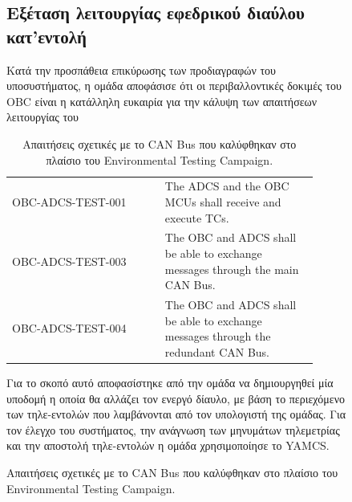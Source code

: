 \documentclass[a4paper,nobib,justified]{tufte-book}
\begin{document}
\begin{figure}
\clearpage
\subsection{Εξέταση λειτουργίας εφεδρικού διαύλου κατ'εντολή}
\label{chap:switch-tc}
Κατά την προσπάθεια επικύρωσης των προδιαγραφών του υποσυστήματος, η ομάδα αποφάσισε ότι οι περιβαλλοντικές δοκιμές του OBC είναι η κατάλληλη ευκαιρία για την κάλυψη των απαιτήσεων λειτουργίας του 

\begin{table}
    \centering
    \caption[Απαιτήσεις σχετικές με το CAN Bus]{Απαιτήσεις σχετικές με το CAN Bus που καλύφθηκαν στο πλαίσιο του Environmental Testing Campaign.}
    \label{tab:campaign-requirements}
    \begin{tabular}{|p{0.45\linewidth}|p{0.45\linewidth}|}
        \hline
        \rowcolor[HTML]{4F5054}
        \multicolumn{2}{|c|}{\color[HTML]{FFFFFF} Requirements} \\ \hline
        \rowcolor[HTML]{F0F0F1} OBC-ADCS-TEST-001 & The ADCS and the OBC MCUs shall receive and execute TCs. \\ \hline
        \rowcolor[HTML]{F0F0F1} OBC-ADCS-TEST-003 & The OBC and ADCS shall be able to exchange messages through the main CAN Bus. \\ \hline
        \rowcolor[HTML]{F0F0F1} OBC-ADCS-TEST-004 & The OBC and ADCS shall be able to exchange messages through the redundant CAN Bus. \\ \hline
    \end{tabular}
\end{table}

Για το σκοπό αυτό αποφασίστηκε από την ομάδα να δημιουργηθεί μία υποδομή η οποία θα αλλάζει τον ενεργό δίαυλο, με βάση το περιεχόμενο των τηλε-εντολών που λαμβάνονται από τον υπολογιστή της ομάδας. Για τον έλεγχο του συστήματος, την ανάγνωση των μηνυμάτων τηλεμετρίας και την αποστολή τηλε-εντολών η ομάδα χρησιμοποίησε το YAMCS.



\end{figure}
\end{document}
